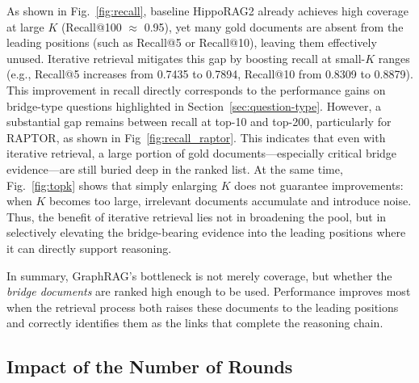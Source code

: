 \documentclass{article} %
\begin{document}
As shown in Fig.~\ref{fig:recall}, baseline HippoRAG2 already achieves high coverage at large $K$ (Recall@100 $\approx$ 0.95), yet many gold documents are absent from the leading positions (such as Recall@5 or Recall@10), leaving them effectively unused. Iterative retrieval mitigates this gap by boosting recall at small-$K$ ranges (e.g., Recall@5 increases from 0.7435 to 0.7894, Recall@10 from 0.8309 to 0.8879). This improvement in recall directly corresponds to the performance gains on bridge-type questions highlighted in Section~\ref{sec:question-type}. However, a substantial gap remains between recall at top-10 and top-200, particularly for RAPTOR, as shown in Fig~\ref{fig:recall_raptor}. This indicates that even with iterative retrieval, a large portion of gold documents—especially critical bridge evidence—are still buried deep in the ranked list. At the same time, Fig.~\ref{fig:topk} shows that simply enlarging $K$ does not guarantee improvements: 
when $K$ becomes too large, irrelevant documents accumulate and introduce noise. 
Thus, the benefit of iterative retrieval lies not in broadening the pool, but in selectively elevating the bridge-bearing evidence into the leading positions where it can directly support reasoning. 

In summary, GraphRAG’s bottleneck is not merely coverage, but whether the \emph{bridge documents} are ranked high enough to be used. 
Performance improves most when the retrieval process both raises these documents to the leading positions and correctly identifies them as the links that complete the reasoning chain.



\subsection{Impact of the Number of Rounds}
\end{document}
